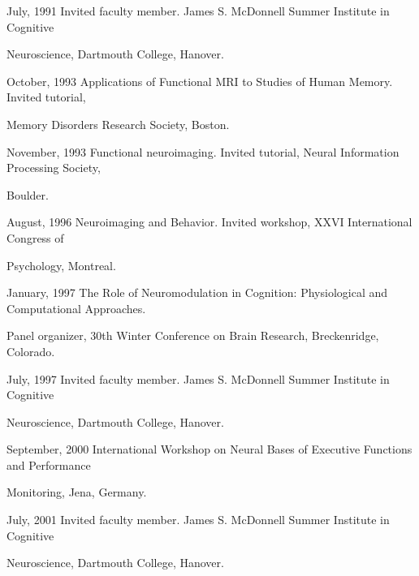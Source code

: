 \documentclass[10 pt]{article}
\begin{document}
July, 1991 \hspace{0.44in} Invited faculty member. James S. McDonnell Summer Institute in Cognitive

\hspace{1.1in} Neuroscience, Dartmouth College, Hanover.

October, 1993 \hspace{0.2in} Applications of Functional MRI to Studies of Human Memory. Invited tutorial,

\hspace{1.1in} Memory Disorders Research Society, Boston.

November, 1993 \hspace{0.09in} Functional neuroimaging. Invited tutorial, Neural Information Processing Society,

\hspace{1.1in} Boulder.

August, 1996 \hspace{0.25in} Neuroimaging and Behavior. Invited workshop, XXVI International Congress of

\hspace{1.1in} Psychology, Montreal.

January, 1997 \hspace{0.23in} The Role of Neuromodulation in Cognition: Physiological and Computational Approaches.

\hspace{1.1in} Panel organizer, 30th Winter Conference on Brain Research, Breckenridge, Colorado.

July, 1997 \hspace{0.44in} Invited faculty member. James S. McDonnell Summer Institute in Cognitive

\hspace{1.1in} Neuroscience, Dartmouth College, Hanover.

September, 2000 \hspace{0.05in} International Workshop on Neural Bases of Executive Functions and Performance

\hspace{1.1in} Monitoring, Jena, Germany.

July, 2001 \hspace{0.44in} Invited faculty member. James S. McDonnell Summer Institute in Cognitive

\hspace{1.1in} Neuroscience, Dartmouth College, Hanover.
    \smallskip

\end{document}
